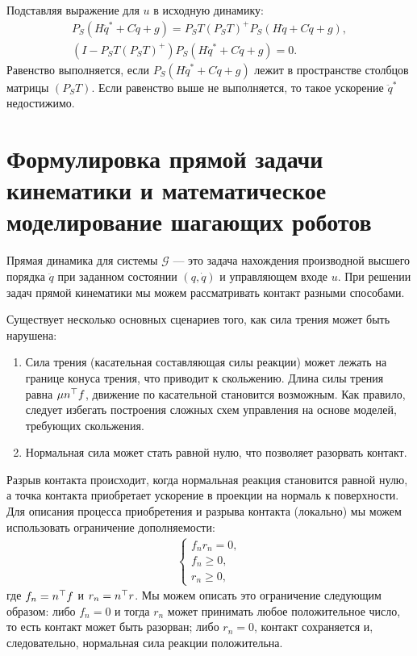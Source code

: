 %
Подставляя выражение для ${u}$ в исходную динамику:
%
\begin{align}
	{P}_S({H}\ddot{{q}}^* + {C}\dot{{q}}+ {g}) = {P}_S{T}({P}_S{T})^+{P}_S({H}\ddot{{q}} + {C}\dot{{q}}+ {g}),
	\\
	({I}-{P}_S{T}({P}_S{T})^+){P}_S({H}\ddot{{q}}^* + {C}\dot{{q}}+ {g}) = 0.
\end{align}
%
%
Равенство выполняется, если ${P}_S({H}\ddot{{q}}^* + {C}\dot{{q}}+ {g})$ лежит в пространстве столбцов матрицы $({P}_S{T})$.
Если равенство выше не выполняется, то такое ускорение $\ddot{{q}}^*$ недостижимо.

\section{Формулировка прямой задачи кинематики и математическое моделирование шагающих роботов}\label{sec:ch2/sect5}
Прямая динамика для системы $\mathcal{G}$ --- это задача нахождения производной высшего порядка $\ddot{{q}}$ при заданном состоянии $({q}, \dot{{q}})$ и управляющем входе ${u}$. При решении задач прямой кинематики мы можем рассматривать контакт разными способами.

Существует несколько основных сценариев того, как сила трения может быть нарушена:
%
\begin{enumerate}
	\item Сила трения (касательная составляющая силы реакции) может лежать на границе конуса трения, что приводит к скольжению. Длина силы трения равна $\mu {n}^\top {f}$, движение по касательной становится возможным. Как правило, следует избегать построения сложных схем управления на основе моделей, требующих скольжения.
	\item Нормальная сила может стать равной нулю, что позволяет разорвать контакт.
\end{enumerate}

Разрыв контакта происходит, когда нормальная реакция становится равной нулю, а точка контакта приобретает ускорение в проекции на нормаль к поверхности.
%
Для описания процесса приобретения и разрыва контакта (локально) мы можем использовать ограничение дополняемости:
%
\begin{align}
	\label{eq:part2_cond}
	\begin{cases}
		f_n r_n = 0, \\
		f_n \geq 0, \\
		r_n \geq 0,
	\end{cases}
\end{align}
где $f_n = {n}^\top{f}$ и $r_n ={n}^\top{r}$. Мы можем описать это ограничение следующим образом: либо $f_n = 0$ и тогда $r_n$ может принимать любое положительное число, то есть контакт может быть разорван; либо $r_n = 0$, контакт сохраняется и, следовательно, нормальная сила реакции положительна.

